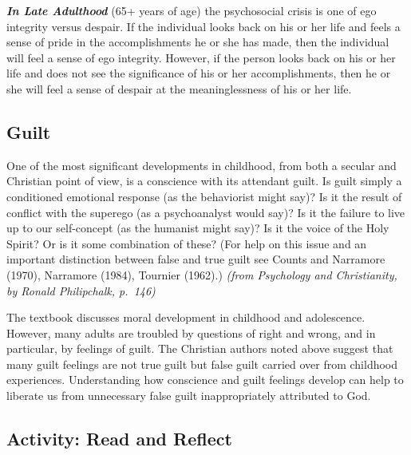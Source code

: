 \documentclass[
]{book}
\begin{document}
\textbf{\emph{In Late Adulthood}} (65+ years of age) the psychosocial crisis is one of ego integrity versus despair. If the individual looks back on his or her life and feels a sense of pride in the accomplishments he or she has made, then the individual will feel a sense of ego integrity. However, if the person looks back on his or her life and does not see the significance of his or her accomplishments, then he or she will feel a sense of despair at the meaninglessness of his or her life.

\hypertarget{guilt}{%
\subsection*{Guilt}\label{guilt}}

One of the most significant developments in childhood, from both a secular and Christian point of view, is a conscience with its attendant guilt. Is guilt simply a conditioned emotional response (as the behaviorist might say)? Is it the result of conflict with the superego (as a psychoanalyst would say)? Is it the failure to live up to our self-concept (as the humanist might say)? Is it the voice of the Holy Spirit? Or is it some combination of these? (For help on this issue and an important distinction between false and true guilt see Counts and Narramore (1970), Narramore (1984), Tournier (1962).) \emph{(from Psychology and Christianity, by Ronald Philipchalk, p.~146)}

The textbook discusses moral development in childhood and adolescence. However, many adults are troubled by questions of right and wrong, and in particular, by feelings of guilt. The Christian authors noted above suggest that many guilt feelings are not true guilt but false guilt carried over from childhood experiences. Understanding how conscience and guilt feelings develop can help to liberate us from unnecessary false guilt inappropriately attributed to God.

\hypertarget{activity-read-and-reflect-2}{%
\subsection*{Activity: Read and Reflect}\label{activity-read-and-reflect-2}}
\end{document}
